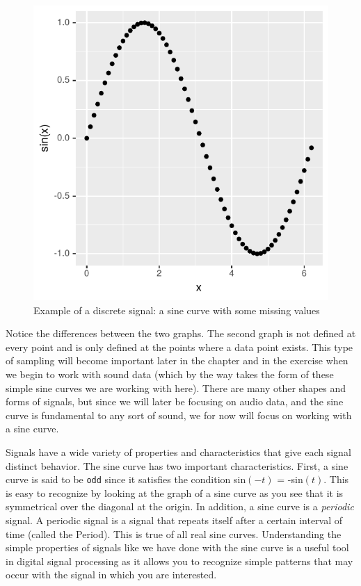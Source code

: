 \documentclass[
]{krantz}
\begin{document}
\begin{figure}
\centering
\includegraphics{bookdown_files/figure-latex/digital-1.pdf}
\caption{\label{fig:digital}Example of a discrete signal: a sine curve with some missing values}
\end{figure}

Notice the differences between the two graphs. The second graph is not defined at every point and is only defined at the points where a data point exists. This type of sampling will become important later in the chapter and in the exercise when we begin to work with sound data (which by the way takes the form of these simple sine curves we are working with here). There are many other shapes and forms of signals, but since we will later be focusing on audio data, and the sine curve is fundamental to any sort of sound, we for now will focus on working with a sine curve.

Signals have a wide variety of properties and characteristics that give each signal distinct behavior. The sine curve has two important characteristics. First, a sine curve is said to be \texttt{odd} since it satisfies the condition sin\((-t)\) = -sin\((t)\). This is easy to recognize by looking at the graph of a sine curve as you see that it is symmetrical over the diagonal at the origin. In addition, a sine curve is a \emph{periodic} signal. A periodic signal is a signal that repeats itself after a certain interval of time (called the Period). This is true of all real sine curves. Understanding the simple properties of signals like we have done with the sine curve is a useful tool in digital signal processing as it allows you to recognize simple patterns that may occur with the signal in which you are interested.
\end{document}

